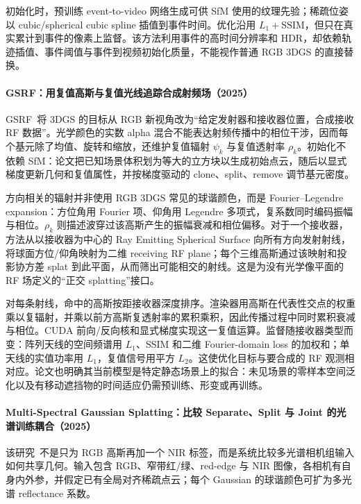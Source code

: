 初始化时，预训练 event-to-video 网络生成可供 SfM 使用的纹理先验；稀疏位姿以 cubic/spherical cubic spline 插值到事件时间。优化沿用 $L_1+\mathrm{SSIM}$，但只在真实累计到事件的像素上监督。该方法利用事件的高时间分辨率和 HDR，却依赖轨迹插值、事件阈值与事件到视频初始化质量，不能视作普通 RGB 3DGS 的直接替换。


\paragraph{GSRF：用复值高斯与复值光线追踪合成射频场（2025）\cite{2502_01826}}
GSRF~\cite{2502_01826}将 3DGS 的目标从 RGB 新视角改为“给定发射器和接收器位置，合成接收 RF 数据”。光学颜色的实数 alpha 混合不能表达射频传播中的相位干涉，因而每个基元除了均值、旋转和缩放，还维护复值辐射 $\psi_k$ 与复值透射率 $\rho_k$。初始化不依赖 SfM：论文把已知场景体积划为等大的立方块以生成初始点云，随后以显式梯度更新几何和复值属性，并按梯度驱动的 clone、split、remove 调节基元密度。

方向相关的辐射并非使用 RGB 3DGS 常见的球谐颜色，而是 Fourier--Legendre expansion：方位角用 Fourier 项、仰角用 Legendre 多项式，复系数同时编码振幅与相位。$\rho_k$ 则描述波穿过该高斯产生的振幅衰减和相位偏移。对于一个接收器，方法从以接收器为中心的 Ray Emitting Spherical Surface 向所有方向发射射线，将球面方位/仰角映射为二维 receiving RF plane；每个三维高斯通过该映射和投影协方差 splat 到此平面，从而筛出可能相交的射线。这是为没有光学像平面的 RF 场定义的“正交 splatting”接口。

对每条射线，命中的高斯按距接收器深度排序。渲染器用高斯在代表性交点的权重乘以复辐射，并乘以前方高斯复透射率的累积乘积，因此传播过程中同时累积衰减与相位。CUDA 前向/反向核和显式梯度实现这一复值运算。监督随接收器类型而变：阵列天线的空间频谱用 $L_1$、SSIM 和二维 Fourier-domain loss 的加权和；单天线的实值功率用 $L_1$，复值信号用平方 $L_2$。这使优化目标与要合成的 RF 观测相对应。论文也明确其当前模型是特定静态场景上的拟合：未见场景的零样本空间泛化以及有移动遮挡物的时间适应仍需预训练、形变或再训练。

\paragraph{Multi-Spectral Gaussian Splatting：比较 Separate、Split 与 Joint 的光谱训练耦合（2025）\cite{2509_00989}}
该研究~\cite{2509_00989}不是只为 RGB 高斯再加一个 NIR 标签，而是系统比较多光谱相机组输入如何共享几何。输入包含 RGB、窄带红/绿、red-edge 与 NIR 图像，各相机有自身内外参，并假定已有全局对齐稀疏点云；每个 Gaussian 的球谐颜色可扩为多光谱 reflectance 系数。

